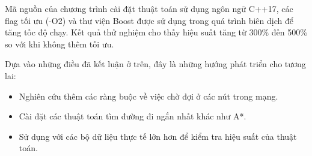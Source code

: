 \documentclass[../main.tex]{subfiles}
\begin{document}
Mã nguồn của chương trình cài đặt thuật toán sử dụng ngôn ngữ C++17, các flag tối ưu (-O2) và thư viện Boost được sử dụng trong quá trình biên dịch để tăng tốc độ chạy. Kết quả thử nghiệm cho thấy hiệu suất tăng từ 300\% đến 500\% so với khi không thêm tối ưu. 

Dựa vào những điều đã kết luận ở trên, đây là những hướng phát triển cho tương lai:

\begin{itemize}
    \item Nghiên cứu thêm các ràng buộc về việc chờ đợi ở các nút trong mạng.
    \item Cài đặt các thuật toán tìm đường đi ngắn nhất khác như A*.
    \item Sử dụng với các bộ dữ liệu thực tế lớn hơn để kiểm tra hiệu suất của thuật toán.
\end{itemize}
\end{document}
